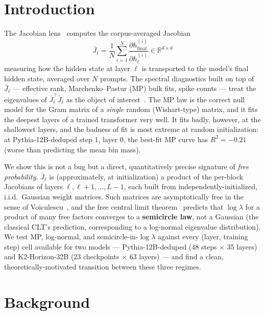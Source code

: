\documentclass[11pt,a4paper]{article}
\begin{document}
\section{Introduction}

The Jacobian lens~\cite{jacobian-lens} computes the corpus-averaged Jacobian
\begin{equation}
  \bar{J}_\ell = \frac{1}{N}\sum_{i=1}^N \frac{\partial h_{\mathrm{final}}^{(i)}}{\partial h_\ell^{(i)}} \in \mathbb{R}^{d\times d}
\end{equation}
measuring how the hidden state at layer $\ell$ is transported to the model's final hidden state, averaged over $N$ prompts. The spectral diagnostics built on top of $\bar{J}_\ell$ --- effective rank, Marchenko--Pastur (MP) bulk fits, spike counts --- treat the eigenvalues of $\bar{J}_\ell^\top \bar{J}_\ell$ as the object of interest~\cite{marchenko1967}. The MP law is the correct null model for the Gram matrix of a \emph{single} random (Wishart-type) matrix, and it fits the deepest layers of a trained transformer very well. It fits badly, however, at the shallowest layers, and the badness of fit is most extreme at random initialization: at Pythia-12B-deduped step 1, layer 0, the best-fit MP curve has $R^2 = -0.21$ (worse than predicting the mean bin mass).

We show this is not a bug but a direct, quantitatively precise signature of \emph{free probability}. $\bar{J}_\ell$ is (approximately, at initialization) a product of the per-block Jacobians of layers $\ell, \ell+1, \dots, L-1$, each built from independently-initialized, i.i.d.\ Gaussian weight matrices. Such matrices are asymptotically free in the sense of Voiculescu~\cite{voiculescu1991}, and the free central limit theorem~\cite{voiculescu1986} predicts that $\log\lambda$ for a product of many free factors converges to a \textbf{semicircle law}, not a Gaussian (the classical CLT's prediction, corresponding to a log-normal eigenvalue distribution). We test MP, log-normal, and semicircle-in-$\log\lambda$ against every (layer, training step) cell available for two models --- Pythia-12B-deduped (48 steps $\times$ 35 layers) and K2-Horizon-32B (23 checkpoints $\times$ 63 layers) --- and find a clean, theoretically-motivated transition between these three regimes.

\section{Background}
\end{document}
